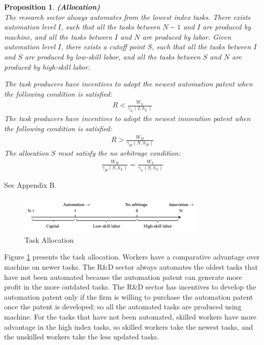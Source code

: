 \documentclass[12pt]{article}
\newtheorem{proposition}{Proposition}
\begin{document}
\begin{proposition}{\bf (Allocation)} \\

The research sector always automates from the lowest index tasks. There exists automation level $I$, such that all the tasks between $N-1$ and $I$ are produced by machine, and all the tasks between $I$ and $N$ are produced by labor. Given automation level $I$, there exists a cutoff point $S$, such that all the tasks between $I$ and $S$ are produced by low-skill labor, and all the tasks between $S$ and $N$ are produced by high-skill labor. 

The task producers have incentives to adopt the newest automation patent when the following condition is satisfied:
\begin{align*}
R < \frac{W_L}{\gamma_L(I,h_L)}
\end{align*}
The task producers have incentives to adopt the newest innovation patent when the following condition is satisfied: 
\begin{align*}
R > \frac{W_H}{\gamma_H(N,h_H)}
\end{align*}
The allocation $S$ must satisfy the no arbitrage condition: 
\begin{align*}
\frac{W_H}{\gamma_H(S,h_L)} = \frac{W_L}{\gamma_L(S,h_L)}
\end{align*}
\end{proposition}
 See Appendix B.

\begin{figure}[h!]
\center
\includegraphics[width=0.8\textwidth]{allocation}
\caption{Task Allocation}
\label{allocation}
\end{figure}
Figure \ref{allocation} presents the task allocation. Workers have a comparative advantage over machine on newer tasks. The R\&D sector always automates the oldest tasks that have not been automated because the automation patent can generate more profit in the more outdated tasks. The R\&D sector has incentives to develop the automation patent only if the firm is willing to purchase the automation patent once the patent is developed; so all the automated tasks are produced using machine. For the tasks that have not been automated, skilled workers have more advantage in the high index tasks, so skilled workers take the newest tasks, and the unskilled workers take the less updated tasks. 
\end{document}
